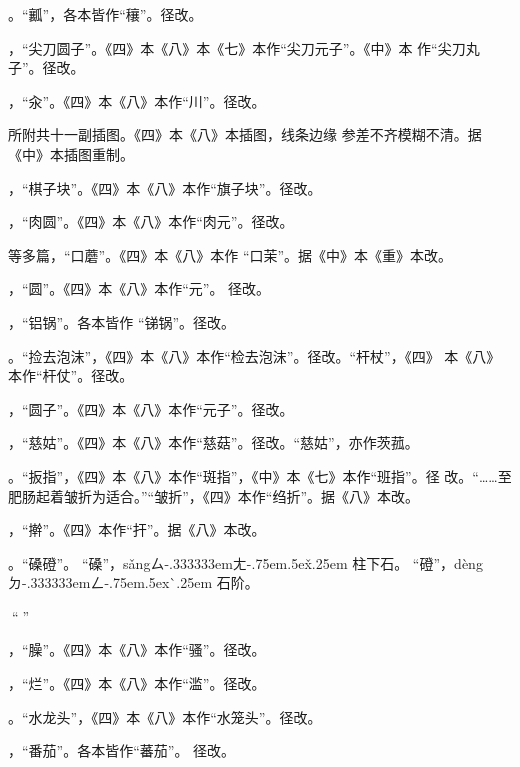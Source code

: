 \begin{list}{}
。“瓤”，各本皆作“穰”。径改。

，“尖刀圆子”。《四》本《八》本《七》本作“尖刀元子”。《中》本
作“尖刀丸子”。径改。

，“汆”。《四》本《八》本作“川”。径改。

所附共十一副插图。《四》本《八》本插图，线条边缘
参差不齐模糊不清。据《中》本插图重制。

，“棋子块”。《四》本《八》本作“旗子块”。径改。

，“肉圆”。《四》本《八》本作“肉元”。径改。

等多篇，“口蘑”。《四》本《八》本作
“口茉”。据《中》本《重》本改。

，“圆”。《四》本《八》本作“元”。
径改。

，“铝锅”。各本皆作
“锑锅”。径改。

。“捡去泡沫”，《四》本《八》本作“检去泡沫”。径改。“杆杖”，《四》
本《八》本作“杆仗”。径改。

，“圆子”。《四》本《八》本作“元子”。径改。

，“慈姑”。《四》本《八》本作“慈菇”。径改。“慈姑”，亦作茨菰。

。“扳指”，《四》本《八》本作“斑指”，《中》本《七》本作“班指”。径
改。“……至肥肠起着皱折为适合。”“皱折”，《四》本作“绉折”。据《八》本改。

，“擀”。《四》本作“扞”。据《八》本改。

。“磉磴”。
“磉”，{s\v{a}ng}{ㄙ\kern-.333333emㄤ\kern-.75em\raise.5ex\hbox{\v{}}\kern.25em}
柱下石。
“磴”，{d\`{e}ng}{ㄉ\kern-.333333emㄥ\kern-.75em\raise.5ex\hbox{\`{}}\kern.25em}
石阶。

，“𠟤”。疑误。

，“臊”。《四》本《八》本作“骚”。径改。

，“烂”。《四》本《八》本作“滥”。径改。

。“水龙头”，《四》本《八》本作“水笼头”。径改。

，“番茄”。各本皆作“蕃茄”。
径改。


\end{list}
